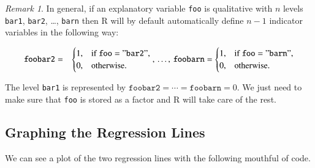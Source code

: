 \documentclass[]{book}
\newenvironment{Shaded}{\begin{snugshade}}{\end{snugshade}}
\newcommand{\KeywordTok}[1]{\textcolor[rgb]{0.13,0.29,0.53}{\textbf{{#1}}}}
\newcommand{\DataTypeTok}[1]{\textcolor[rgb]{0.13,0.29,0.53}{{#1}}}
\newcommand{\DecValTok}[1]{\textcolor[rgb]{0.00,0.00,0.81}{{#1}}}
\newcommand{\StringTok}[1]{\textcolor[rgb]{0.31,0.60,0.02}{{#1}}}
\newcommand{\NormalTok}[1]{{#1}}
\numberwithin{equation}{chapter}
\numberwithin{figure}{chapter}
\theoremstyle{plain}
\theoremstyle{definition}
\theoremstyle{remark}
\newtheorem{rem}[thm]{Remark}
\theoremstyle{definition}
\theoremstyle{definition}
\theoremstyle{remark}
\begin{document}
\begin{rem}
In general, if an explanatory variable \texttt{foo} is qualitative with
\(n\) levels \texttt{bar1}, \texttt{bar2}, \ldots{}, \texttt{barn} then
R will by default automatically define \(n-1\) indicator variables in
the following way:

\begin{eqnarray*} \mathtt{foobar2} & = & \begin{cases} 1, & \mbox{if }\mathtt{foo}=\mathtt{"bar2"},\\ 0, & \mbox{otherwise.}\end{cases},\,\ldots,\,\mathtt{foobarn}=\begin{cases} 1, & \mbox{if }\mathtt{foo}=\mathtt{"barn"},\\ 0, & \mbox{otherwise.}\end{cases} \end{eqnarray*}

The level \texttt{bar1} is represented by
\(\mathtt{foobar2}=\cdots=\mathtt{foobarn}=0\). We just need to make
sure that \texttt{foo} is stored as a factor and R will take care of the
rest.
\end{rem}

\subsection{Graphing the Regression
Lines}\label{graphing-the-regression-lines}

We can see a plot of the two regression lines with the following
mouthful of code.

\begin{Shaded}
\end{Shaded}
\end{document}
